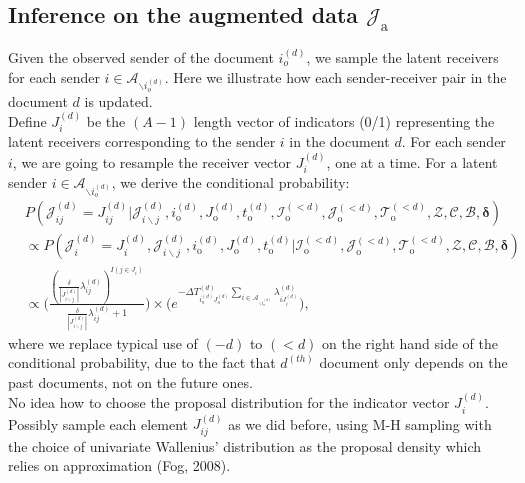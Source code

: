 \documentclass[a4paper]{article}
\begin{document}
  \subsection{Inference on the augmented data $\mathcal{J}_{\mbox{a}}$}
     Given the observed sender of the document $i_o^{(d)}$, we sample the latent receivers for each sender $i \in \mathcal{A}_{\backslash i_o^{(d)}}$. Here we illustrate how each sender-receiver pair in the document $d$ is updated.\\\newline
       Define ${J}^{(d)}_{i}$ be the $(A-1)$ length vector of indicators (0/1) representing the latent receivers corresponding to the sender $i$ in the document $d$. For each sender $i$, we are going to resample the receiver vector ${J}^{(d)}_{i}$, one at a time. For a latent sender $i \in \mathcal{A}_{\backslash i_o^{(d)}}$, we derive the conditional probability:\\
       \begin{equation}
       \begin{aligned}
       &P(\mathcal{J}^{(d)}_{ij} = {J}^{(d)}_{ij}|\mathcal{J}^{(d)}_{i\backslash j}, i^{(d)}_{\mbox{o}}, J^{(d)}_{\mbox{o}}, t^{(d)}_{\mbox{o}}, \mathcal{I}^{(<d)}_{\mbox{o}}, \mathcal{J}^{(<d)}_{\mbox{o}}, \mathcal{T}^{(<d)}_{\mbox{o}}, \mathcal{Z}, \mathcal{C}, \mathcal{B}, \boldsymbol{\delta})\\&\propto P(\mathcal{J}^{(d)}_{i} ={J}^{(d)}_{i}, \mathcal{J}^{(d)}_{i\backslash j}, i^{(d)}_{\mbox{o}}, J^{(d)}_{\mbox{o}}, t^{(d)}_{\mbox{o}}| \mathcal{I}^{(<d)}_{\mbox{o}}, \mathcal{J}^{(<d)}_{\mbox{o}}, \mathcal{T}^{(<d)}_{\mbox{o}}, \mathcal{Z}, \mathcal{C}, \mathcal{B}, \boldsymbol{\delta})
       \\&\propto  \Big(\frac{(\frac{\delta}{|J^{(d)}_{i \backslash j}|}\lambda^{(d)}_{ij})^{I(j \in J_i)}}{\frac{\delta}{|J^{(d)}_{i \backslash j}|}\lambda^{(d)}_{ij}+1}\Big)\times  \Big(e^{-\Delta T^{(d)}_{i_o^{(d)}J_o^{(d)}}\sum\limits_{i\in \mathcal{A}_{\backslash i_o^{(d)}}}\lambda^{(d)}_{iJ^{(d)}_{i}}}\Big),
       \end{aligned}
       \end{equation}
       where we replace typical use of $(-d)$ to $(<d)$ on the right hand side of the conditional probability, due to the fact that $d^{(th)}$ document only depends on the past documents, not on the future ones.\\ \newline
       No idea how to choose the proposal distribution for the indicator vector $J_i^{(d)}$. Possibly sample each element $J_{ij}^{(d)}$ as we did before, using M-H sampling with the choice of univariate Wallenius' distribution as the proposal density which relies on approximation (Fog, 2008).
\end{document}
